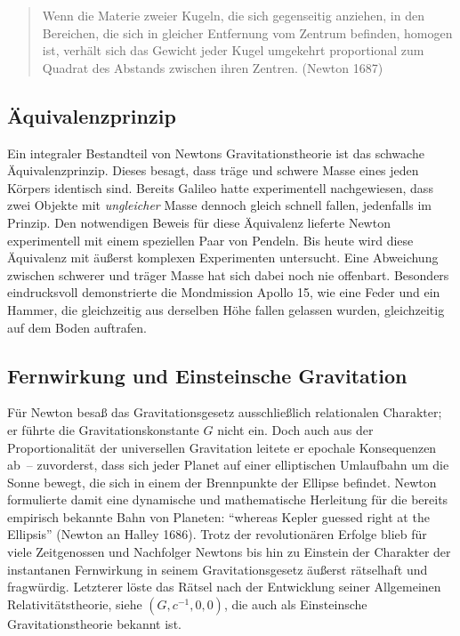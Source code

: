 \begin{quote}
  Wenn die Materie zweier Kugeln, die sich gegenseitig anziehen, in den Bereichen, die sich in gleicher Entfernung vom Zentrum befinden, homogen ist, verhält sich das Gewicht jeder Kugel umgekehrt proportional zum Quadrat des Abstands zwischen ihren Zentren. (Newton 1687)
\end{quote}


\subsection*{Äquivalenzprinzip}

Ein integraler Bestandteil von Newtons Gravitationstheorie ist das schwache Äquivalenzprinzip. Dieses besagt, dass träge und schwere Masse eines jeden Körpers identisch sind. Bereits Galileo hatte experimentell nachgewiesen, dass zwei Objekte mit \emph{ungleicher} Masse dennoch gleich schnell fallen, jedenfalls im Prinzip. Den notwendigen Beweis für diese Äquivalenz lieferte Newton experimentell mit einem speziellen Paar von Pendeln. Bis heute wird diese Äquivalenz mit äußerst komplexen Experimenten untersucht. Eine Abweichung zwischen schwerer und träger Masse hat sich dabei noch nie offenbart. Besonders eindrucksvoll demonstrierte die Mondmission Apollo 15, wie eine Feder und ein Hammer, die gleichzeitig aus derselben Höhe fallen gelassen wurden, gleichzeitig auf dem Boden auftrafen.


\subsection*{Fernwirkung und Einsteinsche Gravitation}

Für Newton besaß das Gravitationsgesetz ausschließlich relationalen Charakter; er führte die Gravitationskonstante $G$ nicht ein. Doch auch aus der Proportionalität der universellen Gravitation leitete er epochale Konsequenzen ab~-- zuvorderst, dass sich jeder Planet auf einer elliptischen Umlaufbahn um die Sonne bewegt, die sich in einem der Brennpunkte der Ellipse befindet. Newton formulierte damit eine dynamische und mathematische Herleitung für die bereits empirisch bekannte Bahn von Planeten: \enquote{whereas Kepler guessed right at the Ellipsis} (Newton an Halley 1686). Trotz der revolutionären Erfolge blieb für viele Zeitgenossen und Nachfolger Newtons bis hin zu Einstein der Charakter der instantanen Fernwirkung in seinem Gravitationsgesetz äußerst rätselhaft und fragwürdig. Letzterer löste das Rätsel nach der Entwicklung seiner Allgemeinen Relativitätstheorie, siehe $(G,c^{-1},0,0)$, die auch als Einsteinsche Gravitationstheorie bekannt ist.
